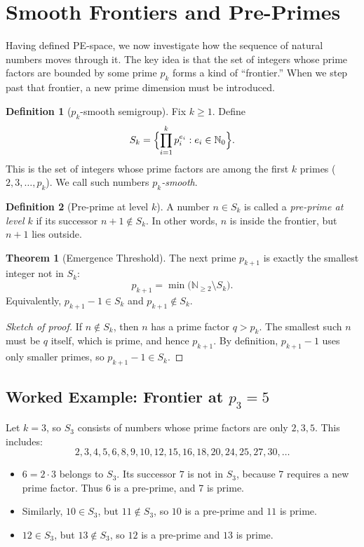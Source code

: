 \documentclass[11pt]{article}
\theoremstyle{definition}
\newtheorem{definition}{Definition}[section]
\newtheorem{theorem}{Theorem}[section]
\begin{document}
\section{Smooth Frontiers and Pre-Primes}

Having defined PE-space, we now investigate how the sequence of natural numbers 
moves through it. The key idea is that the set of integers whose prime factors 
are bounded by some prime $p_k$ forms a kind of ``frontier.'' 
When we step past that frontier, a new prime dimension must be introduced. 

\begin{definition}[$p_k$-smooth semigroup]
Fix $k \geq 1$. Define
\[
S_k = \Bigl\{ \prod_{i=1}^k p_i^{e_i} : e_i \in \mathbb{N}_0 \Bigr\}.
\]
This is the set of integers whose prime factors are among the first $k$ primes 
($2,3,\dots,p_k$). We call such numbers \emph{$p_k$-smooth}.
\end{definition}

\begin{definition}[Pre-prime at level $k$]
A number $n \in S_k$ is called a \emph{pre-prime at level $k$} 
if its successor $n+1 \notin S_k$. 
In other words, $n$ is inside the frontier, but $n+1$ lies outside. 
\end{definition}

\begin{theorem}[Emergence Threshold]
The next prime $p_{k+1}$ is exactly the smallest integer not in $S_k$:
\[
p_{k+1} = \min\bigl(\mathbb{N}_{\geq 2} \setminus S_k \bigr).
\]
Equivalently, $p_{k+1}-1 \in S_k$ and $p_{k+1} \notin S_k$.
\end{theorem}

\begin{proof}[Sketch of proof]
If $n \notin S_k$, then $n$ has a prime factor $q > p_k$. 
The smallest such $n$ must be $q$ itself, which is prime, 
and hence $p_{k+1}$. By definition, $p_{k+1}-1$ uses only smaller primes, 
so $p_{k+1}-1 \in S_k$.
\end{proof}

\subsection{Worked Example: Frontier at $p_3=5$}
Let $k=3$, so $S_3$ consists of numbers whose prime factors are only $2,3,5$.  
This includes:
\[
2,3,4,5,6,8,9,10,12,15,16,18,20,24,25,27,30, \dots
\]

\begin{itemize}
  \item $6 = 2 \cdot 3$ belongs to $S_3$. Its successor $7$ is not in $S_3$, 
        because 7 requires a new prime factor.  
        Thus 6 is a pre-prime, and 7 is prime.  
  \item Similarly, $10 \in S_3$, but $11 \notin S_3$, so $10$ is a pre-prime 
        and $11$ is prime.  
  \item $12 \in S_3$, but $13 \notin S_3$, so $12$ is a pre-prime 
        and $13$ is prime.
\end{itemize}
\end{document}
